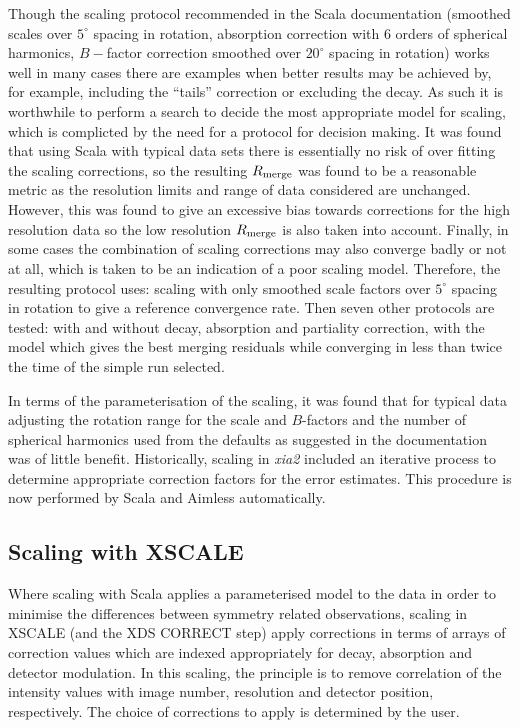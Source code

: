 \documentclass[preprint,pdf]{iucr}
\begin{document}
Though the scaling protocol recommended in the Scala documentation
(smoothed scales over $5^{\circ}$ spacing in rotation, absorption
correction with 6 orders of spherical harmonics, $B-$factor correction
smoothed over $20^{\circ}$ spacing in rotation) works well in many
cases there are examples when better results may be achieved by,
for example, including the ``tails'' correction or excluding the
decay. As such it is worthwhile to perform a search to decide the most
appropriate model for scaling, which is complicted by the need for a
protocol for decision making. It was found that using Scala
with typical data sets there is essentially no risk of over fitting
the scaling corrections, so the resulting $R_{\rm{merge}}$ was found to
be a reasonable metric as the resolution limits and range of data
considered are unchanged. However, this was found to give an excessive
bias towards corrections for the high resolution data so the low
resolution $R_{\rm{merge}}$ is also taken into account. Finally, in
some cases the combination of scaling corrections may also converge
badly or not at all, which is taken to be an indication of a poor
scaling model. Therefore, 
the resulting protocol uses: scaling with only smoothed scale
factors over $5^{\circ}$ spacing in rotation to give a reference
convergence rate. Then seven other protocols are tested: with and
without decay, absorption and partiality correction, with the model
which gives the best merging residuals while converging in less than
twice the time of the simple run selected. 

In terms of the parameterisation of the scaling, it was found that for
typical data adjusting the rotation range for the scale and
$B$-factors and the number of spherical harmonics used from the
defaults as suggested in the documentation was of little benefit.
Historically, scaling in \emph{xia2} included an iterative process to
determine appropriate correction factors for the error estimates. This
procedure is now performed by Scala and Aimless automatically.

\subsection{Scaling with XSCALE}

Where scaling with Scala applies a parameterised model to the data
in order to minimise the differences between symmetry related
observations, scaling in XSCALE (and the XDS CORRECT step) apply
corrections in terms of arrays of correction values which are indexed
appropriately for decay, absorption and detector modulation. In this
scaling, the principle is to remove correlation of the intensity values
with image number, resolution and detector position, 
respectively. The choice of corrections to apply
is determined by the user.
\end{document}

